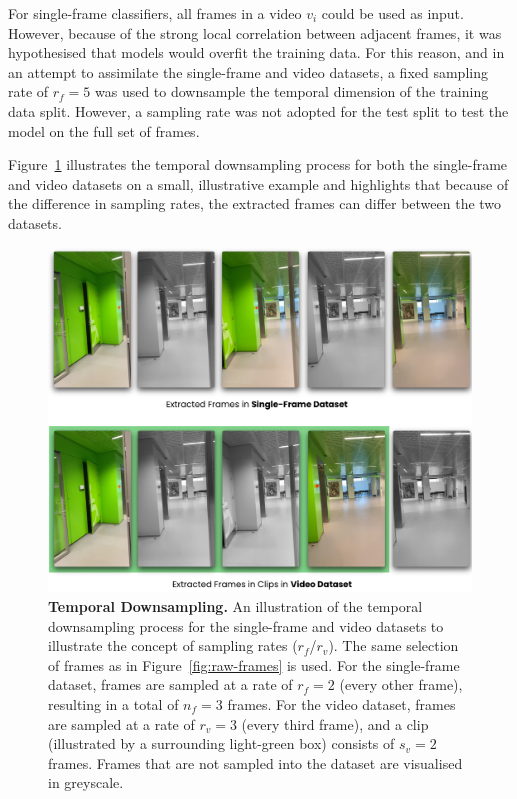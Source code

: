 \documentclass[a4paper]{article}
\begin{document}
For single-frame classifiers, all frames in a video $v_i$ could be used as
input. However, because of the strong local correlation between adjacent frames,
it was hypothesised that models would overfit the training data. For this
reason, and in an attempt to assimilate the single-frame and video datasets, a
fixed sampling rate of $r_f=5$ was used to downsample the temporal dimension of
the training data split. However, a sampling rate was not
adopted for the test split to test the model on the full set of frames.

Figure~\ref{fig:temporal-downsampling} illustrates the temporal downsampling
process for both the single-frame and video datasets on a small, illustrative
example and highlights that because of the difference in sampling rates, the
extracted frames can differ between the two datasets. 

\begin{figure}
  \centering
  \includegraphics[width=\textwidth]{figures/temporal-downsampling.png}
  \caption{\textbf{Temporal Downsampling.} An illustration of the temporal
    downsampling process for the single-frame and video datasets to illustrate
    the concept of sampling rates ($r_f$/$r_v$). The same selection of frames as
    in Figure~\ref{fig:raw-frames} is used. For the single-frame dataset, frames
    are sampled at a rate of $r_f=2$ (every other frame), resulting in a total
    of $n_f=3$ frames. For the video dataset, frames are sampled at a rate of
    $r_v=3$ (every third frame), and a clip (illustrated by a surrounding
    light-green box) consists of $s_v=2$ frames. Frames that are not sampled into
    the dataset are visualised in greyscale.} 
  \label{fig:temporal-downsampling}
\end{figure}
\end{document}
